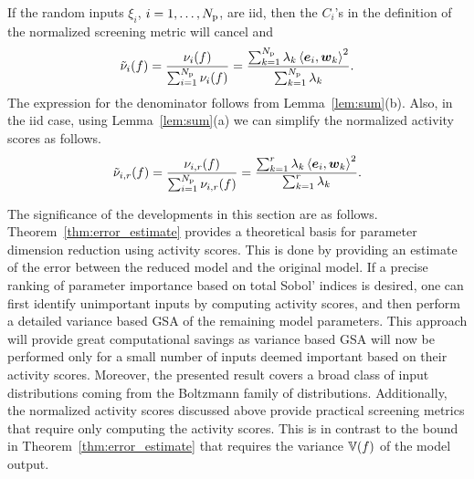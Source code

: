 \begin{remark}
If the random inputs $\xi_i$, $i = 1, \ldots, {N_\text{p}}$, are iid, then 
the $C_i$'s in the definition of the normalized screening metric will cancel and 
\[
    \tilde{\nu}_i(f) = \frac{\nu_i(f)}{\sum_{i=1}^\Np \nu_i(f)} 
      = \frac{\sum_{k=1}^\Np \lambda_k \ip{\vec{e}_i}{\vec{w}_k}^2}{\sum_{k = 1}^\Np \lambda_k}.
\]
The expression for the denominator follows from Lemma~\ref{lem:sum}(b). 
Also, in the iid case, using Lemma~\ref{lem:sum}(a) we can simplify the normalized activity scores as follows. 
\[
   \actt{f}{i}{r} =  \frac{\act{f}{i}{r}}{\sum_{i=1}^\Np \act{f}{i}{r}} = 
                     \frac{\sum_{k=1}^r \lambda_k \ip{\vec{e}_i}{\vec{w}_k}^2}
                          {\sum_{k = 1}^r \lambda_k}.
\]
\end{remark}

The significance of the developments in this section are as follows.
Theorem~\ref{thm:error_estimate} provides a theoretical basis for parameter dimension
reduction using activity scores. This is done by providing an estimate of the
error between the reduced model and the original model. If a precise ranking of
parameter importance based on total Sobol' indices is desired, one
can first identify unimportant inputs by computing activity scores, and then
perform a detailed variance based GSA of the remaining model parameters. This approach will 
provide great computational savings as variance based GSA will now be performed only
for a small number of
inputs deemed important based on their activity scores. Moreover, the
presented result covers a broad class of input distributions coming from 
the Boltzmann family of distributions.
Additionally, the normalized activity scores discussed above provide practical
screening metrics that require only computing the activity scores. This is in
contrast to the bound in Theorem~\ref{thm:error_estimate} that requires the
variance $\mathbb{V}(f)$ of the model output.
